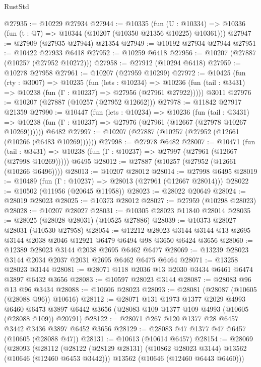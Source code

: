 \begin{lexlean}{RustStd}
\begin{coremodule}
@27935 := @10229 @27934
@27944 := @10335
    (fun (U : @10334) => @10336 (fun (t : @7) => @10344 (@10207 (@10350 @21356 @10225) @10361)))
@27947 := @27909 (@27935 @27944) @21354
@27949 := @10192 @27934 @27944
@27951 := @10422 @27933 @6418
@27952 := @10259 @6418
@27956 := @10207 (@27887 (@10257 (@27952 @10272)))
@27958 := @27912 (@10294 @6418)
@27959 := @10278 @27958
@27961 := @10207 (@27959 @10299)
@27972 := @10425
    (fun (rty : @3007) =>
    @10235
      (fun (lets : @10234) =>
      @10236 (fun (tail : @3431) => @10238 (fun (Γ : @10237) => @27956 (@27961 @27922)))))
    @3011
@27976 := @10207 (@27887 (@10257 (@27952 @12662)))
@27978 := @11842 @27917 @21359
@27990 := @10447
    (fun (lets : @10234) =>
    @10236
      (fun (tail : @3431) =>
      @10238 (fun (Γ : @10237) => @27976 (@27961 (@12667 (@27978 @10267 @10269))))))
    @6482
@27997 := @10207 (@27887 (@10257 (@27952 (@12661 (@10266 (@6483 @10269))))))
@27998 := @27978 @6482
@28007 := @10471
    (fun (tail : @3431) => @10238 (fun (Γ : @10237) => @27997 (@27961 (@12667 (@27998 @10269)))))
    @6495
@28012 := @27887 (@10257 (@27952 (@12661 (@10266 @6496))))
@28013 := @10207 @28012
@28014 := @27998 @6495
@28019 := @10489 (fun (Γ : @10237) => @28013 (@27961 (@12667 @28014)))
@28022 := @10502 (@11956 (@20645 @11958))
@28023 := @28022 @20649
@28024 := @28019 @28023
@28025 := @10373 @28012
@28027 := @27959 (@10298 @28023)
@28028 := @10207 @28027
@28031 := @10305 @28023 @11840 @28014
@28035 := @28025 (@28028 @28031) (@10525 @27886)
@28039 := @10373 @28027 @28031 (@10530 @27958)
@28054 := @12212
    @28023
    @3144
    @3144
    @13
    @2695
    @3144
    @2038
    @2046
    @12921
    @6479
    @6494
    @98
    @3650
    @6424
    @3656
@28060 := @12389 @28023 @3144 @2038 @2695 @6462 @6477
@28069 := @13239 @28023 @3144 @2034 @2037 @2031 @2695 @6462 @6475 @6464
@28071 := @13258 @28023 @3144
@28081 := @28071 @118 @2036 @13 @2030 @3434 @6461 @6474 @3897 @6432 @3656
@28083 := @10597 @28023 @3144
@28087 := @28083 @96 @13 @96 @3434
@28088 := @10606 @28023
@28093 := @28081 (@28087 (@10605 (@28088 @96)) @10616)
@28112 := @28071
    @131
    @1973
    @1377
    @2029
    @4993
    @6460
    @6473
    @3897
    @6442
    @3656
    (@28083 @109 @1377 @109 @4993 (@10605 (@28088 @109)) @20791)
@28122 := @28071 @267 @120 @1377 @28 @6457 @3442 @3436 @3897 @6452 @3656
@28129 := @28083 @47 @1377 @47 @6457 (@10605 (@28088 @47))
@28131 := @10613 (@10614 @6457)
@28154 := @28069
    (@28093
      (@28112
        (@28122 (@28129 @28131) (@10862 @28023 @3144) @13562 (@10646 (@12460 @6453 @3442)))
        @13562
        (@10646 (@12460 @6443 @6460)))

\end{coremodule}
\end{lexlean}
